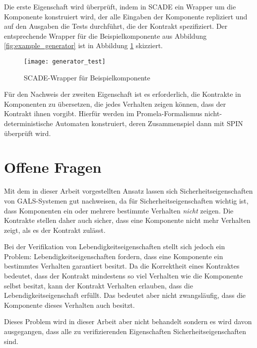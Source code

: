 Die erste Eigenschaft wird überprüft, indem in SCADE ein Wrapper um die Komponente konstruiert wird, der alle Eingaben der Komponente repliziert und auf den Ausgaben die Tests durchführt, die der Kontrakt spezifiziert.
Der entsprechende Wrapper für die Beispielkomponente aus Abbildung \ref{fig:example_generator} ist in Abbildung \ref{fig:example_generator_test} skizziert.
\begin{figure}
  \centering
  \texttt{[image: generator\_test]}
  \caption{SCADE-Wrapper für Beispielkomponente}
  \label{fig:example_generator_test}
\end{figure}

Für den Nachweis der zweiten Eigenschaft ist es erforderlich, die Kontrakte in Komponenten zu übersetzen, die jedes Verhalten zeigen können, dass der Kontrakt ihnen vorgibt.
Hierfür werden im Promela-Formalismus nicht-deterministische Automaten konstruiert, deren Zusammenspiel dann mit SPIN überprüft wird.

\section{Offene Fragen}
Mit dem in dieser Arbeit vorgestellten Ansatz lassen sich Sicherheitseigenschaften von GALS-Systemen gut nachweisen, da für Sicherheitseigenschaften wichtig ist, dass Komponenten ein oder mehrere bestimmte Verhalten \emph{nicht} zeigen.
Die Kontrakte stellen daher auch sicher, dass eine Komponente nicht mehr Verhalten zeigt, als es der Kontrakt zulässt.

Bei der Verifikation von Lebendigkeitseigenschaften stellt sich jedoch ein Problem:
Lebendigkeitseigenschaften fordern, dass eine Komponente ein bestimmtes Verhalten garantiert besitzt.
Da die Korrektheit eines Kontraktes bedeutet, dass der Kontrakt mindestens so viel Verhalten wie die Komponente selbst besitzt, kann der Kontrakt Verhalten erlauben, dass die Lebendigkeitseigenschaft erfüllt.
Das bedeutet aber nicht zwangsläufig, dass die Komponente dieses Verhalten auch besitzt.

Dieses Problem wird in dieser Arbeit aber nicht behandelt sondern es wird davon ausgegangen, dass alle zu verifizierenden Eigenschaften Sicherheitseigenschaften sind.